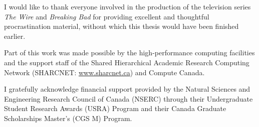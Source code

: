 

I would like to thank everyone involved in the production of the television series \emph{The Wire} and \emph{Breaking Bad} for providing excellent and thoughtful procrastination material, without which this thesis would have been finished earlier.

Part of this work was made possible by the high-performance computing facilities and the support staff of the Shared Hierarchical Academic Research Computing Network (SHARCNET: \href{www.sharcnet.ca}{www.sharcnet.ca}) and Compute Canada.

I gratefully acknowledge financial support provided by the Natural Sciences and Engineering Research Council of Canada (NSERC) through their Undergraduate Student Research Awards (USRA) Program and their Canada Graduate Scholarships Master's (CGS M) Program.

\endgroup